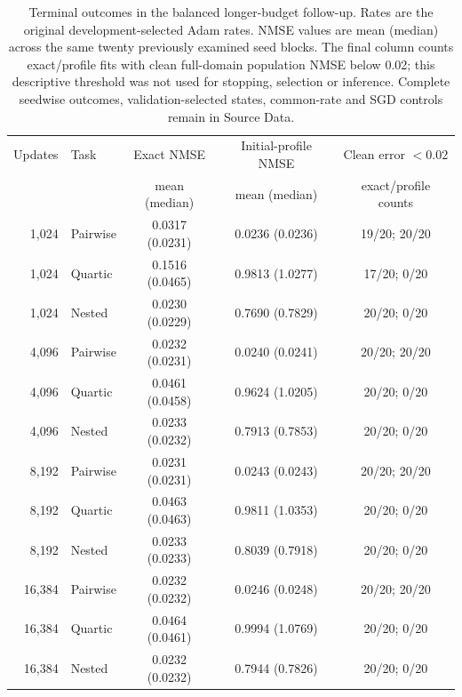 \begin{table}[tbp]
\centering
\small
\caption{Terminal outcomes in the balanced longer-budget follow-up. Rates are the original development-selected Adam rates. NMSE values are mean (median) across the same twenty previously examined seed blocks. The final column counts exact/profile fits with clean full-domain population NMSE below 0.02; this descriptive threshold was not used for stopping, selection or inference. Complete seedwise outcomes, validation-selected states, common-rate and SGD controls remain in Source Data.}
\label{tab:credit_rule_extension_endpoints}
\begin{tabular}{rlccc}
\toprule
Updates & Task & Exact NMSE & Initial-profile NMSE & Clean error $<0.02$ \\
 & & mean (median) & mean (median) & exact/profile counts \\
\midrule
1,024 & Pairwise & 0.0317 (0.0231) & 0.0236 (0.0236) & 19/20; 20/20 \\
1,024 & Quartic & 0.1516 (0.0465) & 0.9813 (1.0277) & 17/20; 0/20 \\
1,024 & Nested & 0.0230 (0.0229) & 0.7690 (0.7829) & 20/20; 0/20 \\
4,096 & Pairwise & 0.0232 (0.0231) & 0.0240 (0.0241) & 20/20; 20/20 \\
4,096 & Quartic & 0.0461 (0.0458) & 0.9624 (1.0205) & 20/20; 0/20 \\
4,096 & Nested & 0.0233 (0.0232) & 0.7913 (0.7853) & 20/20; 0/20 \\
8,192 & Pairwise & 0.0231 (0.0231) & 0.0243 (0.0243) & 20/20; 20/20 \\
8,192 & Quartic & 0.0463 (0.0463) & 0.9811 (1.0353) & 20/20; 0/20 \\
8,192 & Nested & 0.0233 (0.0233) & 0.8039 (0.7918) & 20/20; 0/20 \\
16,384 & Pairwise & 0.0232 (0.0232) & 0.0246 (0.0248) & 20/20; 20/20 \\
16,384 & Quartic & 0.0464 (0.0461) & 0.9994 (1.0769) & 20/20; 0/20 \\
16,384 & Nested & 0.0232 (0.0232) & 0.7944 (0.7826) & 20/20; 0/20 \\
\bottomrule
\end{tabular}
\end{table}
